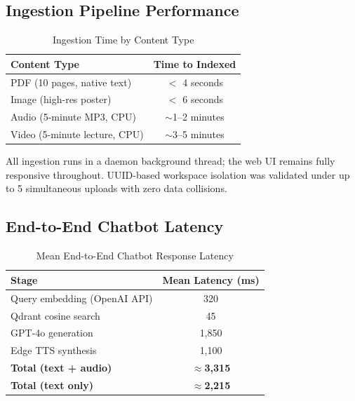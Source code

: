 \documentclass[conference]{IEEEtran}
\begin{document}

\subsection{Ingestion Pipeline Performance}

\begin{table}[h!]
\centering
\caption{Ingestion Time by Content Type}
\label{tab:ingestion}
\begin{tabular}{lc}
\toprule
\textbf{Content Type} & \textbf{Time to Indexed} \\
\midrule
PDF (10 pages, native text)          & $<$ 4 seconds \\
Image (high-res poster)              & $<$ 6 seconds \\
Audio (5-minute MP3, CPU)            & $\sim$1--2 minutes \\
Video (5-minute lecture, CPU)        & $\sim$3--5 minutes \\
\bottomrule
\end{tabular}
\end{table}

All ingestion runs in a daemon background thread; the web UI remains fully responsive
throughout. UUID-based workspace isolation was validated under up to 5 simultaneous
uploads with zero data collisions.

\subsection{End-to-End Chatbot Latency}

\begin{table}[h!]
\centering
\caption{Mean End-to-End Chatbot Response Latency}
\label{tab:latency}
\begin{tabular}{lc}
\toprule
\textbf{Stage} & \textbf{Mean Latency (ms)} \\
\midrule
Query embedding (OpenAI API)    & 320 \\
Qdrant cosine search            & 45  \\
GPT-4o generation               & 1,850 \\
Edge TTS synthesis              & 1,100 \\
\textbf{Total (text + audio)}   & \textbf{$\approx$3,315} \\
\textbf{Total (text only)}      & \textbf{$\approx$2,215} \\
\bottomrule
\end{tabular}
\end{table}
\end{document}
